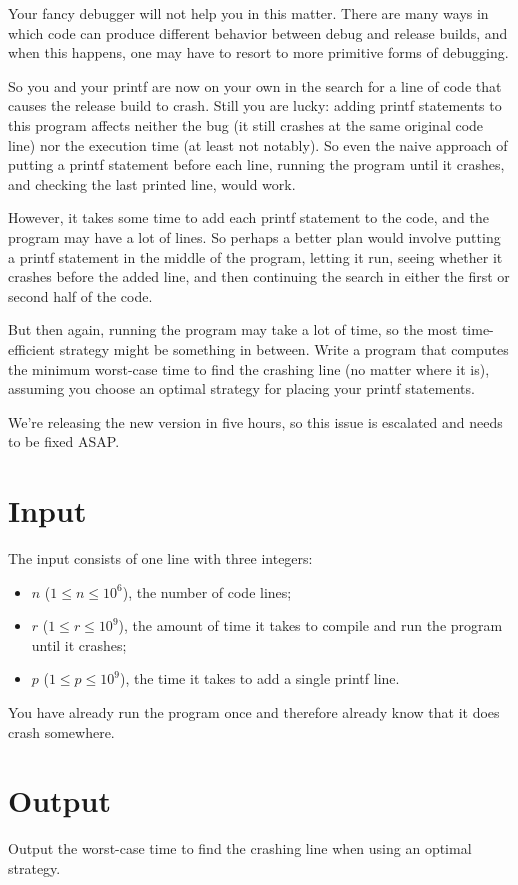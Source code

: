 
%
\noindent
Your fancy debugger will not help you in this matter. There are many
ways in which code can produce different behavior between debug and
release builds, and when this happens, one may have to resort to more
primitive forms of debugging.

So you and your printf are now on your own in the search for a line of
code that causes the release build to crash. Still you are lucky:
adding printf statements to this program affects neither the bug (it
still crashes at the same original code line) nor the execution time
(at least not notably).  So even the naive approach of putting a
printf statement before each line, running the program until it
crashes, and checking the last printed line, would work.

However, it takes some time to add each printf statement to the code,
and the program may have a lot of lines. So perhaps a better plan would involve
putting a printf statement in the middle of the program, letting it run, seeing
whether it crashes before the added line, and then continuing the search in
either the first or second half of the code.

But then again, running the program may take a lot of time, so the
most time-efficient strategy might be something in between.  Write a
program that computes the minimum worst-case time to find the crashing
line (no matter where it is), assuming you choose an optimal strategy
for placing your printf statements.

We're releasing the new version in five hours, so this issue is escalated and needs to be fixed ASAP.


\section*{Input}

The input consists of one line with three integers:
\begin{itemize}
\item $n$ ($1 \le n \le 10^6$), the number of code lines;
\item $r$ ($1 \le r \le 10^9$), the amount of time it takes to compile and run the program until it crashes;
\item $p$ ($1 \le p \le 10^9$), the time it takes to add a single printf line.
\end{itemize}

You have already run the program once and therefore already know that it does crash somewhere.

\section*{Output}

Output the worst-case time to find the crashing line when using an
optimal strategy.


